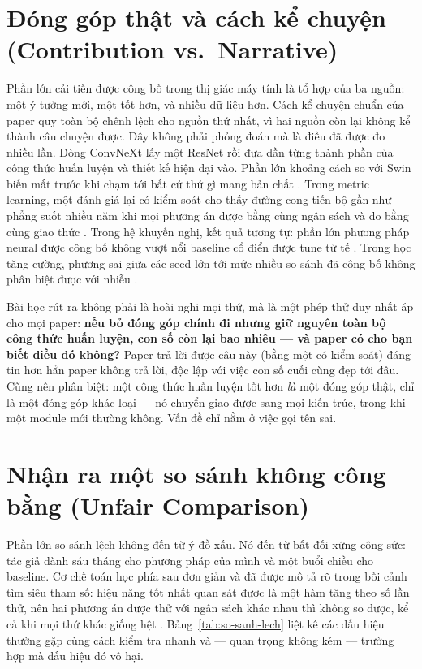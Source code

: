 \documentclass[../../deep_learning.tex]{subfiles}
\begin{document}
\section{Đóng góp thật và cách kể chuyện (Contribution vs.\ Narrative)}
Phần lớn cải tiến được công bố trong thị giác máy tính là tổ hợp của ba nguồn: một ý tưởng mới, một  tốt hơn, và nhiều dữ liệu hơn. Cách kể chuyện chuẩn của paper quy toàn bộ chênh lệch cho nguồn thứ nhất, vì hai nguồn còn lại không kể thành câu chuyện được. Đây không phải phỏng đoán mà là điều đã được đo nhiều lần. Dòng ConvNeXt lấy một ResNet rồi đưa dần từng thành phần của công thức huấn luyện và thiết kế hiện đại vào. Phần lớn khoảng cách so với Swin biến mất trước khi chạm tới bất cứ thứ gì mang bản chất  \cite{liu2022convnext}. Trong metric learning, một đánh giá lại có kiểm soát cho thấy đường cong tiến bộ gần như phẳng suốt nhiều năm khi mọi phương án được  bằng cùng ngân sách và đo bằng cùng giao thức \cite{musgrave2020metric}. Trong hệ khuyến nghị, kết quả tương tự: phần lớn phương pháp neural được công bố không vượt nổi baseline cổ điển được tune tử tế \cite{dacrema2019worrying}. Trong học tăng cường, phương sai giữa các seed lớn tới mức nhiều so sánh đã công bố không phân biệt được với nhiễu \cite{henderson2018deep}.

Bài học rút ra không phải là hoài nghi mọi thứ, mà là một phép thử duy nhất áp cho mọi paper: \textbf{nếu bỏ đóng góp chính đi nhưng giữ nguyên toàn bộ công thức huấn luyện, con số còn lại bao nhiêu — và paper có cho bạn biết điều đó không?} Paper trả lời được câu này (bằng một  có kiểm soát) đáng tin hơn hẳn paper không trả lời, độc lập với việc con số cuối cùng đẹp tới đâu. Cũng nên phân biệt: một công thức huấn luyện tốt hơn \emph{là} một đóng góp thật, chỉ là một đóng góp khác loại — nó chuyển giao được sang mọi kiến trúc, trong khi một module mới thường không. Vấn đề chỉ nằm ở việc gọi tên sai.

\section{Nhận ra một so sánh không công bằng (Unfair Comparison)}
Phần lớn so sánh lệch không đến từ ý đồ xấu. Nó đến từ bất đối xứng công sức: tác giả dành sáu tháng cho phương pháp của mình và một buổi chiều cho baseline. Cơ chế toán học phía sau đơn giản và đã được mô tả rõ trong bối cảnh tìm siêu tham số: hiệu năng tốt nhất quan sát được là một hàm tăng theo số lần thử, nên hai phương án được thử với ngân sách khác nhau thì không so được, kể cả khi mọi thứ khác giống hệt \cite{bergstra2012random}. Bảng~\ref{tab:so-sanh-lech} liệt kê các dấu hiệu thường gặp cùng cách kiểm tra nhanh và — quan trọng không kém — trường hợp mà dấu hiệu đó vô hại.
\end{document}
